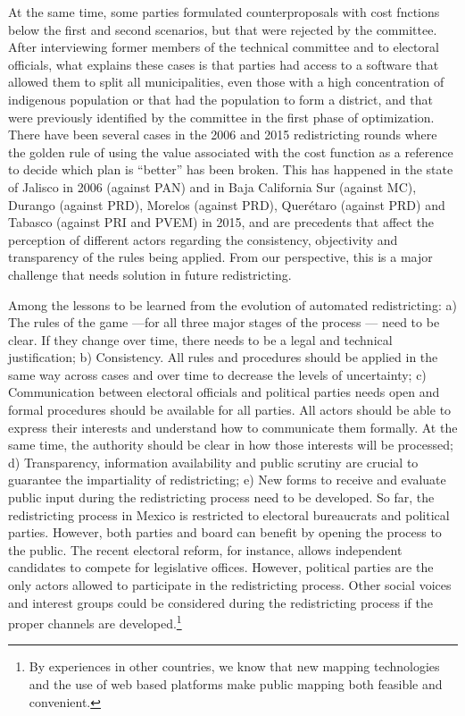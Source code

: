 \documentclass[letter,12pt]{article}
\begin{document}
At the same time, some parties formulated counterproposals with cost fnctions below the first and second scenarios, but that were rejected by the committee. After interviewing former members of the technical committee and to electoral officials, what explains these cases is that parties had access to a software that allowed them to split all municipalities, even those with a high concentration of indigenous population or that had the population to form a district, and that were previously identified by the committee in the first phase of optimization. There have been several cases in the 2006 and 2015 redistricting rounds where the golden rule of using the value associated with the cost function as a reference to decide which plan is ``better'' has been broken. This has happened in the state of Jalisco in 2006 (against PAN) and in Baja California Sur (against MC), Durango (against PRD), Morelos (against PRD), Quer\'etaro (against PRD) and Tabasco (against PRI and PVEM) in 2015, and are precedents that affect the perception of different actors regarding the consistency, objectivity and transparency of the rules being applied. From our perspective, this is a major challenge that needs solution in future redistricting. 

Among the lessons to be learned from the evolution of automated redistricting: a) The rules of the game ---for all three major stages of the process ---  need to be clear. If they change over time, there needs to be a legal and technical justification; b) Consistency. All rules and procedures should be applied in the same way across cases and over time to decrease the levels of uncertainty; c) Communication between electoral officials and political parties needs open and formal procedures should be available for all parties. All actors should be able to express their interests and understand how to communicate them formally. At the same time, the authority should be clear in how those interests will be processed; d) Transparency, information availability and public scrutiny are crucial to guarantee the impartiality of redistricting; e) New forms to receive and evaluate public input during the redistricting process need to be developed.  So far, the redistricting process in Mexico is restricted to electoral bureaucrats and political parties. However, both parties and board can benefit by opening the process to the public. The recent electoral reform, for instance, allows independent candidates to compete for legislative offices. However, political parties are the only actors allowed to participate in the redistricting process. Other social voices and interest groups could be considered during the redistricting process if the proper channels are developed.\footnote{By experiences in other countries, we know that new mapping technologies and the use of web based platforms make public mapping both feasible and convenient.}   
\end{document}
